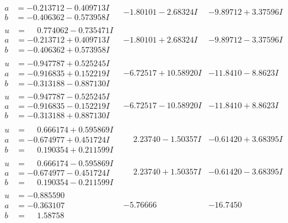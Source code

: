 \documentclass[1p]{elsarticle_modified}
\theoremstyle{definition}
\begin{document}
$$\begin{array}{c|c|c}
\begin{aligned}
a &= -0.213712 - 0.409713 I \\
b &= -0.406362 - 0.573958 I\end{aligned}
 & -1.80101 - 2.68324 I & -9.89712 + 3.37596 I \\ \hline\begin{aligned}
u &= \phantom{-}0.774062 - 0.735471 I \\
a &= -0.213712 + 0.409713 I \\
b &= -0.406362 + 0.573958 I\end{aligned}
 & -1.80101 + 2.68324 I & -9.89712 - 3.37596 I \\ \hline\begin{aligned}
u &= -0.947787 + 0.525245 I \\
a &= -0.916835 + 0.152219 I \\
b &= -0.313188 - 0.887130 I\end{aligned}
 & -6.72517 + 10.58920 I & -11.8410 - 8.8623 I \\ \hline\begin{aligned}
u &= -0.947787 - 0.525245 I \\
a &= -0.916835 - 0.152219 I \\
b &= -0.313188 + 0.887130 I\end{aligned}
 & -6.72517 - 10.58920 I & -11.8410 + 8.8623 I \\ \hline\begin{aligned}
u &= \phantom{-}0.666174 + 0.595869 I \\
a &= -0.674977 + 0.451724 I \\
b &= \phantom{-}0.190354 + 0.211599 I\end{aligned}
 & \phantom{-}2.23740 - 1.50357 I & -0.61420 + 3.68395 I \\ \hline\begin{aligned}
u &= \phantom{-}0.666174 - 0.595869 I \\
a &= -0.674977 - 0.451724 I \\
b &= \phantom{-}0.190354 - 0.211599 I\end{aligned}
 & \phantom{-}2.23740 + 1.50357 I & -0.61420 - 3.68395 I \\ \hline\begin{aligned}
u &= -0.885590\phantom{ +0.000000I} \\
a &= -0.363107\phantom{ +0.000000I} \\
b &= \phantom{-}1.58758\phantom{ +0.000000I}\end{aligned}
 & -5.76666\phantom{ +0.000000I} & -16.7450\phantom{ +0.000000I} \\ \hline\begin{aligned}

\end{aligned}
\end{array}$$
\end{document}
